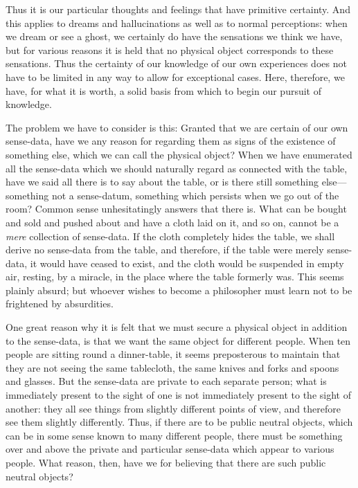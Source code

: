 \documentclass[oneside,letterpaper,12pt]{book}
\begin{document}
Thus it is our particular thoughts and feelings that have primitive
certainty. And this applies to dreams and hallucinations as well as to
normal perceptions: when we dream or see a ghost, we certainly do have
the sensations we think we have, but for various reasons it is held that
no physical object corresponds to these sensations. Thus the certainty
of our knowledge of our own experiences does not have to be limited in
any way to allow for exceptional cases. Here, therefore, we have, for
what it is worth, a solid basis from which to begin our pursuit of
knowledge.

The problem we have to consider is this: Granted that we are certain of
our own sense-data, have we any reason for regarding them as signs of
the existence of something else, which we can call the physical object?
When we have enumerated all the sense-data which we should naturally
regard as connected with the table, have we said all there is to say
about the table, or is there still something else---something not a
sense-datum, something which persists when we go out of the room? Common
sense unhesitatingly answers that there is. What can be bought and sold
and pushed about and have a cloth laid on it, and so on, cannot be a
\emph{mere} collection of sense-data. If the cloth completely hides the
table, we shall derive no sense-data from the table, and therefore, if
the table were merely sense-data, it would have ceased to exist, and the
cloth would be suspended in empty air, resting, by a miracle, in the
place where the table formerly was. This seems plainly absurd; but
whoever wishes to become a philosopher must learn not to be frightened
by absurdities.

One great reason why it is felt that we must secure a physical object in
addition to the sense-data, is that we want the same object for
different people. When ten people are sitting round a dinner-table, it
seems preposterous to maintain that they are not seeing the same
tablecloth, the same knives and forks and spoons and glasses. But the
sense-data are private to each separate person; what is immediately
present to the sight of one is not immediately present to the sight of
another: they all see things from slightly different points of view, and
therefore see them slightly differently. Thus, if there are to be public
neutral objects, which can be in some sense known to many different
people, there must be something over and above the private and
particular sense-data which appear to various people. What reason, then,
have we for believing that there are such public neutral objects?
\end{document}

